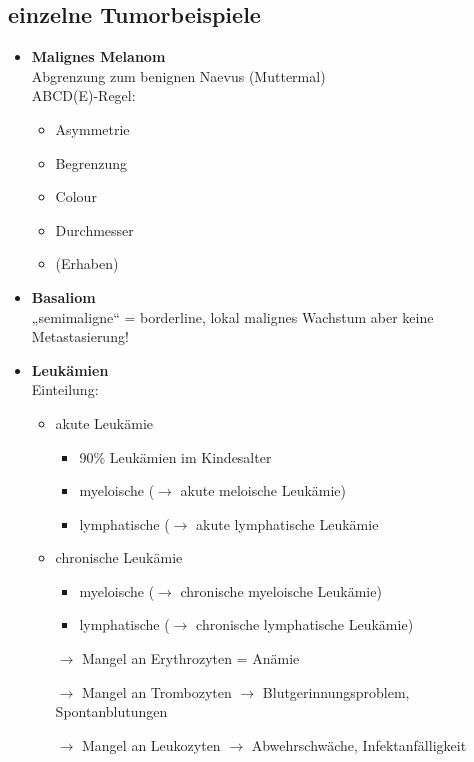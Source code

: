 	\subsection{einzelne Tumorbeispiele}
		\begin{itemize}
			\item \textbf{Malignes Melanom}\\
				Abgrenzung zum benignen Naevus (Muttermal)\\
				ABCD(E)-Regel:
				\begin{itemize}
					\item Asymmetrie
					\item Begrenzung
					\item Colour
					\item Durchmesser
					\item (Erhaben)
				\end{itemize}
			\item \textbf{Basaliom}\\
				„semimaligne“ = borderline, lokal malignes Wachstum aber keine Metastasierung!
			\item \textbf{Leukämien}\\
				Einteilung:
				\begin{itemize}					
					\item akute Leukämie
						\begin{itemize}
							\item 90\% Leukämien im Kindesalter
							\item myeloische ($\rightarrow$ akute meloische Leukämie)
							\item lymphatische ($\rightarrow$ akute lymphatische Leukämie
						\end{itemize}
					\item chronische Leukämie
						\begin{itemize}
							\item myeloische ($\rightarrow$ chronische myeloische Leukämie)
							\item lymphatische ($\rightarrow$ chronische lymphatische Leukämie)
						\end{itemize}
					\item[$\rightarrow$] Mangel an Erythrozyten = Anämie
					\item[$\rightarrow$] Mangel an Trombozyten $\rightarrow$ Blutgerinnungsproblem, Spontanblutungen
					\item[$\rightarrow$] Mangel an Leukozyten $\rightarrow$ Abwehrschwäche, Infektanfälligkeit
				\end{itemize}

\end{itemize}
